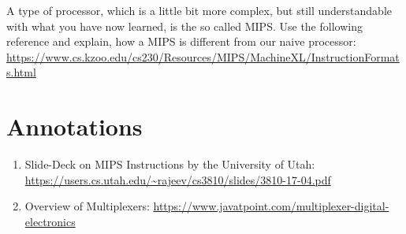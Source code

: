 \documentclass{dcbl/challenge}
\begin{document}
\begin{aufgabe}
    A type of processor, which is a little bit more complex, but still understandable with what you have now learned, is the so called MIPS. 
    Use the following reference and explain, how a MIPS is different from our naive processor: \url{https://www.cs.kzoo.edu/cs230/Resources/MIPS/MachineXL/InstructionFormats.html}
\end{aufgabe}

\section*{Annotations}
\begin{enumerate}
    \item Slide-Deck on MIPS Instructions by the University of Utah: \url{https://users.cs.utah.edu/~rajeev/cs3810/slides/3810-17-04.pdf}
    \item Overview of Multiplexers: \url{https://www.javatpoint.com/multiplexer-digital-electronics}
\end{enumerate}
\end{document}
